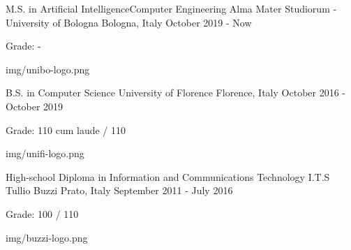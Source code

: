 
\begin{cventries}

  \logocventry
    {M.S. in Artificial Intelligence{\enskip\cdotp\enskip}Computer Engineering}
    {Alma Mater Studiorum - University of Bologna}
    {Bologna, Italy}
    {October 2019 - Now}
    {
      \begin{cvitems}
        \item {Grade: -}
      \end{cvitems}
    }
    {img/unibo-logo.png}

  \logocventry
    {B.S. in Computer Science}
    {University of Florence}
    {Florence, Italy}
    {October 2016 - October 2019}
    {
      \begin{cvitems}
        \item {Grade: 110 cum laude / 110}
      \end{cvitems}
    }
    {img/unifi-logo.png}

  \logocventry
    {High-school Diploma in Information and Communications Technology}
    {I.T.S Tullio Buzzi}
    {Prato, Italy}
    {September 2011 - July 2016}
    {
      \begin{cvitems}
        \item {Grade: 100 / 110}
      \end{cvitems}
    }
    {img/buzzi-logo.png}

\end{cventries}
